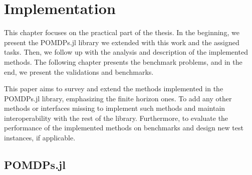 \chapter{Implementation}

This chapter focuses on the practical part of the thesis. In the beginning, we present the POMDPs.jl library we extended with this work and the assigned tasks. Then, we follow up with the analysis and description of the implemented methods. The following chapter presents the benchmark problems, and in the end, we present the validations and benchmarks.

This paper aims to survey and extend the methods implemented in the POMDPs.jl library, emphasizing the finite horizon ones. To add any other methods or interfaces missing to implement such methods and maintain interoperability with the rest of the library. Furthermore, to evaluate the performance of the implemented methods on benchmarks and design new test instances, if applicable.








\section{POMDPs.jl}

